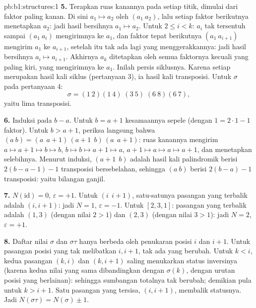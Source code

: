 \begin{solution}{pb:b1:structures:1}
\textbf{5.} Terapkan ruas kanannya pada setiap titik, dimulai dari faktor
paling kanan. Di sini $a_1 \mapsto a_2$ oleh $(a_1\ a_2)$, lalu setiap faktor
berikutnya menetapkan $a_2$: jadi hasil bersihnya $a_1 \mapsto a_2$. Untuk $2 \leq i < k$:
$a_i$ tak tersentuh sampai $(a_1\ a_i)$ mengirimnya ke $a_1$, dan
faktor tepat berikutnya $(a_1\ a_{i+1})$ mengirim $a_1$ ke $a_{i+1}$, setelah
itu tak ada lagi yang menggerakkannya: jadi hasil bersihnya $a_i \mapsto a_{i+1}$. Akhirnya $a_k$
ditetapkan oleh semua faktornya kecuali yang paling kiri, yang mengirimnya ke $a_1$.
Inilah persis siklusnya. Karena setiap  merupakan hasil kali
siklus (pertanyaan 3), ia hasil kali transposisi. Untuk
$\sigma$ pada pertanyaan 4:
\[
\sigma = (1\ 2)(1\ 4)\;(3\ 5)\;(6\ 8)(6\ 7),
\]
yaitu lima transposisi.

\textbf{6.} Induksi pada $b - a$. Untuk $b = a + 1$ kesamaannya
sepele (dengan $1 = 2\cdot1 - 1$ faktor). Untuk $b > a + 1$, periksa
langsung bahwa $(a\ b) = (a\ \ a{+}1)\,(a{+}1\ \ b)\,(a\ \ a{+}1)$:
ruas kanannya mengirim $a \mapsto a{+}1 \mapsto b \mapsto b$, $b
\mapsto b \mapsto a{+}1 \mapsto a$, $a{+}1 \mapsto a \mapsto a
\mapsto a{+}1$, dan menetapkan selebihnya. Menurut induksi, $(a{+}1\ \ b)$ adalah
hasil kali palindromik berisi $2(b - a - 1) - 1$ transposisi
bersebelahan, sehingga $(a\ b)$ berisi $2(b - a) - 1$ transposisi: yaitu bilangan
ganjil.

\textbf{7.} $N(\mathrm{id}) = 0$, $\varepsilon = +1$. Untuk $(i\ \
i{+}1)$, satu-satunya pasangan yang terbalik adalah $(i, i+1)$: jadi $N = 1$,
$\varepsilon = -1$. Untuk $[2, 3, 1]$: pasangan yang terbalik adalah $(1,
3)$ (dengan nilai $2 > 1$) dan $(2, 3)$ (dengan nilai $3 > 1$): jadi $N = 2$,
$\varepsilon = +1$.

\textbf{8.} Daftar nilai $\sigma$ dan $\sigma\tau$ hanya berbeda
oleh penukaran posisi $i$ dan $i + 1$. Untuk pasangan
posisi yang tak melibatkan $i, i+1$, tak ada yang berubah. Untuk $k < i$,
kedua pasangan $(k, i)$ dan $(k, i+1)$ saling menukarkan status
inversinya (karena kedua nilai yang sama dibandingkan dengan $\sigma(k)$, dengan
urutan posisi yang berlainan): sehingga sumbangan totalnya
tak berubah; demikian pula untuk $k > i + 1$. Satu pasangan yang tersisa, $(i,
i+1)$, membalik statusnya. Jadi $N(\sigma\tau) = N(\sigma) \pm 1$.


\end{solution}

